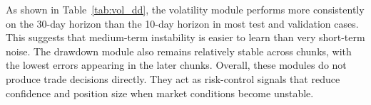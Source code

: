 \documentclass[conference]{IEEEtran}
\begin{document}
As shown in Table~\ref{tab:vol_dd}, the volatility module performs more consistently on the 30-day horizon than the 10-day horizon in most test and validation cases. This suggests that medium-term instability is easier to learn than very short-term noise. The drawdown module also remains relatively stable across chunks, with the lowest errors appearing in the later chunks. Overall, these modules do not produce trade decisions directly. They act as risk-control signals that reduce confidence and position size when market conditions become unstable.
\end{document}
